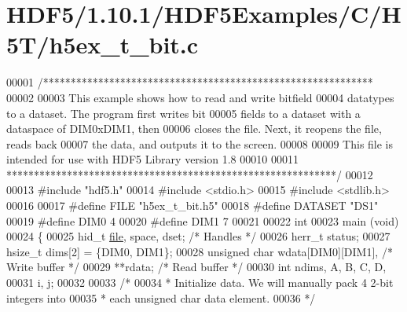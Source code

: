 \hypertarget{_h_d_f5_21_810_81_2_h_d_f5_examples_2_c_2_h5_t_2h5ex__t__bit_8c_source}{}\section{H\+D\+F5/1.10.1/\+H\+D\+F5\+Examples/\+C/\+H5\+T/h5ex\+\_\+t\+\_\+bit.c}
\label{_h_d_f5_21_810_81_2_h_d_f5_examples_2_c_2_h5_t_2h5ex__t__bit_8c_source}

\begin{DoxyCode}
00001 \textcolor{comment}{/************************************************************}
00002 \textcolor{comment}{}
00003 \textcolor{comment}{  This example shows how to read and write bitfield}
00004 \textcolor{comment}{  datatypes to a dataset.  The program first writes bit}
00005 \textcolor{comment}{  fields to a dataset with a dataspace of DIM0xDIM1, then}
00006 \textcolor{comment}{  closes the file.  Next, it reopens the file, reads back}
00007 \textcolor{comment}{  the data, and outputs it to the screen.}
00008 \textcolor{comment}{}
00009 \textcolor{comment}{  This file is intended for use with HDF5 Library version 1.8}
00010 \textcolor{comment}{}
00011 \textcolor{comment}{ ************************************************************/}
00012 
00013 \textcolor{preprocessor}{#include "hdf5.h"}
00014 \textcolor{preprocessor}{#include <stdio.h>}
00015 \textcolor{preprocessor}{#include <stdlib.h>}
00016 
00017 \textcolor{preprocessor}{#define FILE            "h5ex\_t\_bit.h5"}
00018 \textcolor{preprocessor}{#define DATASET         "DS1"}
00019 \textcolor{preprocessor}{#define DIM0            4}
00020 \textcolor{preprocessor}{#define DIM1            7}
00021 
00022 \textcolor{keywordtype}{int}
00023 main (\textcolor{keywordtype}{void})
00024 \{
00025     hid\_t           \hyperlink{structfile}{file}, space, dset;          \textcolor{comment}{/* Handles */}
00026     herr\_t          status;
00027     hsize\_t         dims[2] = \{DIM0, DIM1\};
00028     \textcolor{keywordtype}{unsigned} \textcolor{keywordtype}{char}   wdata[DIM0][DIM1],          \textcolor{comment}{/* Write buffer */}
00029                     **rdata;                    \textcolor{comment}{/* Read buffer */}
00030     \textcolor{keywordtype}{int}             ndims, A, B, C, D,
00031                     i, j;
00032 
00033     \textcolor{comment}{/*}
00034 \textcolor{comment}{     * Initialize data.  We will manually pack 4 2-bit integers into}
00035 \textcolor{comment}{     * each unsigned char data element.}
00036 \textcolor{comment}{     */}

\end{DoxyCode}
